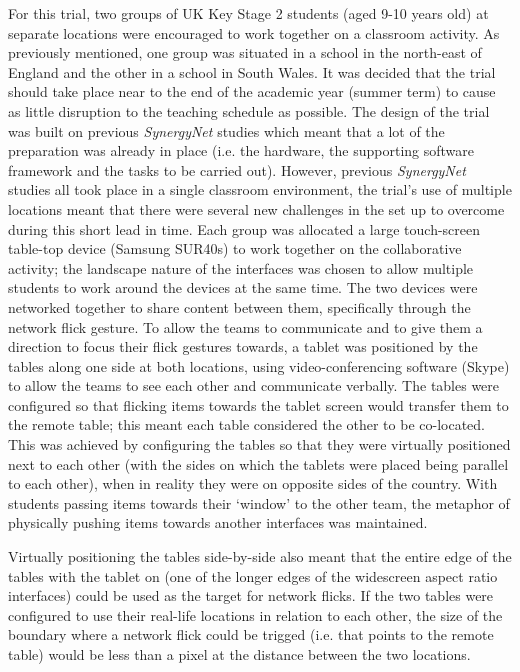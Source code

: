 \documentclass[twocolumn]{svjour3}          %
\begin{document}
For this trial, two groups of UK Key Stage 2 students (aged 9-10 years old) at separate locations were encouraged to work together on a classroom activity.
As previously mentioned, one group was situated in a school in the north-east of England and the other in a school in South Wales.
It was decided that the trial should take place near to the end of the academic year (summer term) to cause as little disruption to the teaching schedule as possible.
The design of the trial was built on previous {\emph{SynergyNet}} studies which meant that a lot of the preparation was already in place (i.e. the hardware, the supporting software framework and the tasks to be carried out).
However, previous {\emph{SynergyNet}} studies all took place in a single classroom environment, the trial's use of multiple locations meant that there were several new challenges in the set up to overcome during this short lead in time.
Each group was allocated a large touch-screen table-top device (Samsung SUR40s) to work together on the collaborative activity; the landscape nature of the interfaces was chosen to allow multiple students to work around the devices at the same time.
The two devices were networked together to share content between them, specifically through the network flick gesture.
To allow the teams to communicate and to give them a direction to focus their flick gestures towards, a tablet was positioned by the tables along one side at both locations, using video-conferencing software (Skype) to allow the teams to see each other and communicate verbally.
The tables were configured so that flicking items towards the tablet screen would transfer them to the remote table; this meant each table considered the other to be co-located.
This was achieved by configuring the tables so that they were virtually positioned next to each other (with the sides on which the tablets were placed being parallel to each other), when in reality they were on opposite sides of the country.
With students passing items towards their `window' to the other team, the metaphor of physically pushing items towards another interfaces was maintained.

Virtually positioning the tables side-by-side also meant that the entire edge of the tables with the tablet on (one of the longer edges of the widescreen aspect ratio interfaces) could be used as the target for network flicks.
If the two tables were configured to use their real-life locations in relation to each other, the size of the boundary where a network flick could be trigged (i.e. that points to the remote table) would be less than a pixel at the distance between the two locations.
\end{document}
